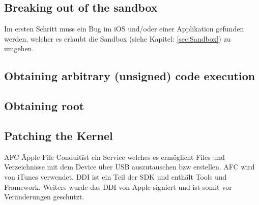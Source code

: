 \cite{TaiG[1]}
\cite{TaiG[2]}
\cite{TaiG[3]}

\subsection{Breaking out of the sandbox}
\label{sec:JBStep1}
Im ersten Schritt muss ein Bug im iOS und/oder einer Applikation gefunden werden, welcher es erlaubt \glqq die Sandbox\grqq{} (siehe Kapitel: \ref{sec:Sandbox}) zu umgehen. 

\subsection{Obtaining arbitrary (unsigned) code execution}
\label{sec:JBStep2}

\subsection{Obtaining root}
\label{sec:JBStep3}

\subsection{Patching the Kernel}
\label{sec:JBStep4}



AFC \"Apple File Conduit\" ist ein Service welches es ermöglicht Files und Verzeichnisse mit dem Device über USB auszutauschen bzw erstellen. AFC wird von iTunes verwendet. 
DDI ist ein Teil der SDK und enthält Tools und Framework. Weiters wurde das  DDI von Apple signiert und ist somit vor Veränderungen geschützt. 




